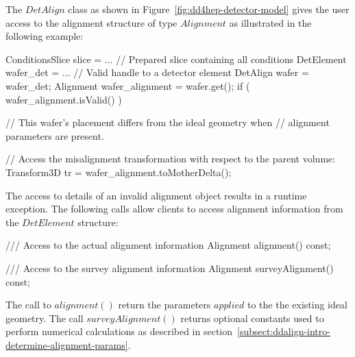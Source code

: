 \documentclass[10pt,a4paper]{article}
\begin{document}
\noindent
The $DetAlign$ class as shown in Figure~\ref{fig:dd4hep-detector-model}
gives the user access to the alignment structure of type $Alignment$ as 
illustrated in the following example:
\begin{code}
    ConditionsSlice slice = ...  // Prepared slice containing all conditions
    DetElement wafer_det  = ...  // Valid handle to a detector element
    DetAlign   wafer = wafer_det;
    Alignment  wafer_alignment = wafer.get();
    if ( wafer_alignment.isValid() )  {
        // This wafer's placement differs from the ideal geometry when
        // alignment parameters are present.
        
        // Access the misalignment transformation with respect to the parent volume:
        Transform3D tr = wafer_alignment.toMotherDelta();
    }
\end{code}
The access to details of an invalid alignment object results in a runtime 
exception. The following calls allow clients to access alignment information
from the $DetElement$ structure:
\begin{code}
      /// Access to the actual alignment information
      Alignment alignment() const;

      /// Access to the survey alignment information
      Alignment surveyAlignment() const;
\end{code}
The call to $alignment()$ return the parameters $applied$ to the the existing
ideal geometry. The call $surveyAlignment()$ returns optional constants used 
to perform numerical calculations as described in 
section~\ref{subsect:ddalign-intro-determine-alignment-params}.
\end{document}
